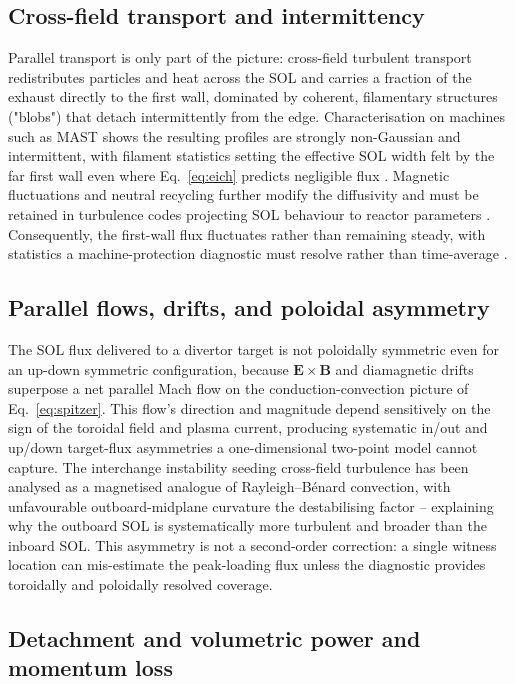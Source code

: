 \subsection{Cross-field transport and intermittency}

Parallel transport is only part of the picture: cross-field turbulent transport redistributes particles and heat across the SOL and carries a fraction of the exhaust directly to the first wall, dominated by coherent, filamentary structures ("blobs") that detach intermittently from the edge. Characterisation on machines such as MAST shows the resulting profiles are strongly non-Gaussian and intermittent, with filament statistics setting the effective SOL width felt by the far first wall even where Eq.~\eqref{eq:eich} predicts negligible flux \cite{ref0600}. Magnetic fluctuations and neutral recycling further modify the diffusivity and must be retained in turbulence codes projecting SOL behaviour to reactor parameters \cite{ref0605}. Consequently, the first-wall flux fluctuates rather than remaining steady, with statistics a machine-protection diagnostic must resolve rather than time-average \cite{ref0611}.

\subsection{Parallel flows, drifts, and poloidal asymmetry}

The SOL flux delivered to a divertor target is not poloidally symmetric even for an up-down symmetric configuration, because $\mathbf{E}\times\mathbf{B}$ and diamagnetic drifts superpose a net parallel Mach flow on the conduction-convection picture of Eq.~\eqref{eq:spitzer}. This flow's direction and magnitude depend sensitively on the sign of the toroidal field and plasma current, producing systematic in/out and up/down target-flux asymmetries a one-dimensional two-point model cannot capture. The interchange instability seeding cross-field turbulence has been analysed as a magnetised analogue of Rayleigh--B\'{e}nard convection, with unfavourable outboard-midplane curvature the destabilising factor -- explaining why the outboard SOL is systematically more turbulent and broader than the inboard SOL. This asymmetry is not a second-order correction: a single witness location can mis-estimate the peak-loading flux unless the diagnostic provides toroidally and poloidally resolved coverage.

\subsection{Detachment and volumetric power and momentum loss}

